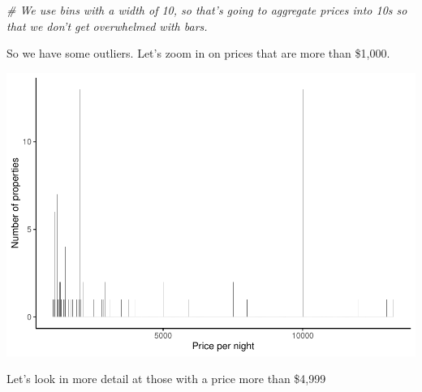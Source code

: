 \documentclass[
]{book}
\newenvironment{Shaded}{\begin{snugshade}}{\end{snugshade}}
\newcommand{\CommentTok}[1]{\textcolor[rgb]{0.56,0.35,0.01}{\textit{#1}}}
\newcommand{\DataTypeTok}[1]{\textcolor[rgb]{0.13,0.29,0.53}{#1}}
\newcommand{\DecValTok}[1]{\textcolor[rgb]{0.00,0.00,0.81}{#1}}
\newcommand{\KeywordTok}[1]{\textcolor[rgb]{0.13,0.29,0.53}{\textbf{#1}}}
\newcommand{\NormalTok}[1]{#1}
\newcommand{\OperatorTok}[1]{\textcolor[rgb]{0.81,0.36,0.00}{\textbf{#1}}}
\newcommand{\StringTok}[1]{\textcolor[rgb]{0.31,0.60,0.02}{#1}}
\begin{document}
\begin{Shaded}
\begin{Highlighting}[]
\CommentTok{#  We use bins with a width of 10, so that's going to aggregate prices into 10s so that we don't get overwhelmed with bars.}
\end{Highlighting}
\end{Shaded}

So we have some outliers. Let's zoom in on prices that are more than \$1,000.

\begin{Shaded}
\end{Shaded}

\includegraphics{telling_stories_with_data_files/figure-latex/unnamed-chunk-304-1.pdf}

Let's look in more detail at those with a price more than \$4,999
\end{document}
